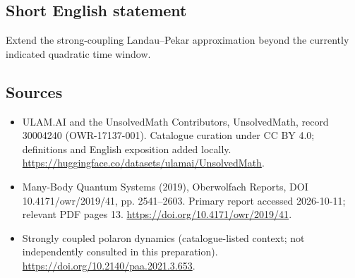 \documentclass[11pt]{article}
\begin{document}
\subsection{Short English statement}
Extend the strong-coupling Landau--Pekar approximation beyond the currently indicated quadratic time window.
\subsection{Sources}
\begin{itemize}
\item[\hypertarget{source:30004240:1}{S1}] ULAM.AI and the UnsolvedMath Contributors, UnsolvedMath, record 30004240 (OWR-17137-001). Catalogue curation under CC BY 4.0; definitions and English exposition added locally.
\url{https://huggingface.co/datasets/ulamai/UnsolvedMath}.
\item[\hypertarget{source:30004240:2}{S2}] Many-Body Quantum Systems (2019), Oberwolfach Reports, DOI 10.4171/owr/2019/41, pp. 2541--2603. Primary report accessed 2026-10-11; relevant PDF pages 13.
\url{https://doi.org/10.4171/owr/2019/41}.
\item[\hypertarget{source:30004240:3}{S3}] Strongly coupled polaron dynamics (catalogue-listed context; not independently consulted in this preparation).
\url{https://doi.org/10.2140/paa.2021.3.653}.
\end{itemize}
\label{end:30004240}
\end{document}
